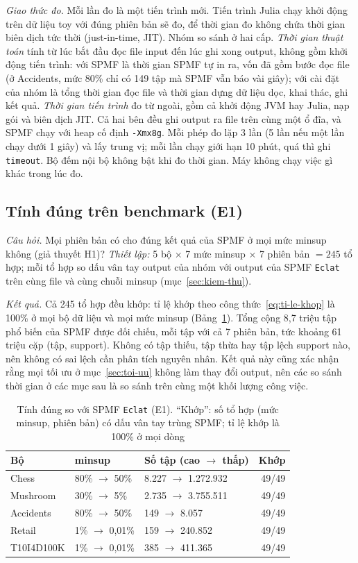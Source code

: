 \emph{Giao thức đo.} Mỗi lần đo là một tiến trình mới. Tiến trình Julia chạy khởi động trên dữ liệu toy với đúng phiên bản sẽ đo, để thời gian đo không chứa thời gian biên dịch tức thời (just-in-time, JIT). Nhóm so sánh ở hai cấp. \emph{Thời gian thuật toán} tính từ lúc bắt đầu đọc file input đến lúc ghi xong output, không gồm khởi động tiến trình: với SPMF là thời gian SPMF tự in ra, vốn đã gồm bước đọc file (ở Accidents, mức 80\% chỉ có 149 tập mà SPMF vẫn báo vài giây); với cài đặt của nhóm là tổng thời gian đọc file và thời gian dựng dữ liệu dọc, khai thác, ghi kết quả. \emph{Thời gian tiến trình} đo từ ngoài, gồm cả khởi động JVM hay Julia, nạp gói và biên dịch JIT. Cả hai bên đều ghi output ra file trên cùng một ổ đĩa, và SPMF chạy với heap cố định \texttt{-Xmx8g}. Mỗi phép đo lặp 3 lần (5 lần nếu một lần chạy dưới 1 giây) và lấy trung vị; mỗi lần chạy giới hạn 10 phút, quá thì ghi \texttt{timeout}. Bộ đếm nội bộ không bật khi đo thời gian. Máy không chạy việc gì khác trong lúc đo.

\subsection{Tính đúng trên benchmark (E1)}
\label{sec:e1}

\emph{Câu hỏi.} Mọi phiên bản có cho đúng kết quả của SPMF ở mọi mức minsup không (giả thuyết H1)? \emph{Thiết lập:} 5 bộ $\times$ 7 mức minsup $\times$ 7 phiên bản $= 245$ tổ hợp; mỗi tổ hợp so dấu vân tay output của nhóm với output của SPMF \texttt{Eclat} trên cùng file và cùng chuỗi minsup (mục~\ref{sec:kiem-thu}).

\emph{Kết quả.} Cả 245 tổ hợp đều khớp: tỉ lệ khớp theo công thức~\eqref{eq:ti-le-khop} là 100\% ở mọi bộ dữ liệu và mọi mức minsup (Bảng~\ref{tab:b05}). Tổng cộng 8,7 triệu tập phổ biến của SPMF được đối chiếu, mỗi tập với cả 7 phiên bản, tức khoảng 61 triệu cặp (tập, support). Không có tập thiếu, tập thừa hay tập lệch support nào, nên không có sai lệch cần phân tích nguyên nhân. Kết quả này cũng xác nhận rằng mọi tối ưu ở mục~\ref{sec:toi-uu} không làm thay đổi output, nên các so sánh thời gian ở các mục sau là so sánh trên cùng một khối lượng công việc.

\begin{table}[t]
\caption{Tính đúng so với SPMF \texttt{Eclat} (E1). ``Khớp'': số tổ hợp (mức minsup, phiên bản) có dấu vân tay trùng SPMF; tỉ lệ khớp là 100\% ở mọi dòng}
\label{tab:b05}
\centering
\footnotesize
\setlength{\tabcolsep}{3pt}
\begin{tabular}{@{}lllr@{}}
\toprule
Bộ & minsup & Số tập (cao $\to$ thấp) & Khớp \\
\midrule
Chess & 80\% $\to$ 50\% & 8.227 $\to$ 1.272.932 & 49/49 \\
Mushroom & 30\% $\to$ 5\% & 2.735 $\to$ 3.755.511 & 49/49 \\
Accidents & 80\% $\to$ 50\% & 149 $\to$ 8.057 & 49/49 \\
Retail & 1\% $\to$ 0,01\% & 159 $\to$ 240.852 & 49/49 \\
T10I4D100K & 1\% $\to$ 0,01\% & 385 $\to$ 411.365 & 49/49 \\
\bottomrule
\end{tabular}
\end{table}


